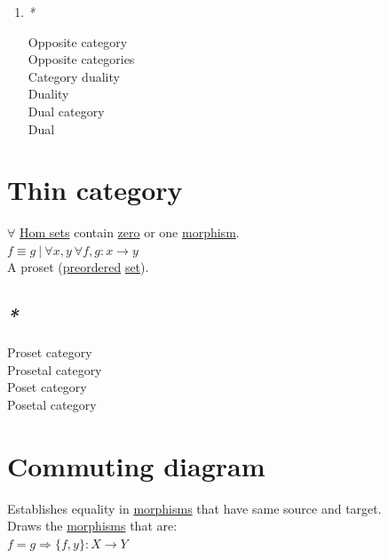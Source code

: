 \documentclass[a4paper,14pt,oneside]{book}
\begin{document}
\begin{enumerate}
\item \emph{*}
\label{sec:orgf5b4600}

\label{org0641959}Opposite category\\
\label{orgd92905e}Opposite categories\\
\label{org3ab4e72}Category duality\\
\label{orgf3e1944}Duality\\
\label{org8c78669}Dual category\\
\label{orgccd1357}Dual\\
\end{enumerate}

\section{\label{orga42e8b7}Thin category}
\label{sec:orgf70202a}
\(\forall\) \hyperref[orgff689e2]{Hom sets} contain \hyperref[org5935190]{zero} or one \hyperref[org2170e98]{morphism}.\\

\(f \equiv g \ | \ \forall x,y \ \forall f,g: x \to y\)\\

A proset (\hyperref[orgd804c52]{preordered} \hyperref[orge119629]{set}).\\

\subsection{\emph{*}}
\label{sec:org8c5f0e4}

\label{org5d87b1c}Proset category\\
\label{org27436a4}Prosetal category\\
\label{org8366f2f}Poset category\\
\label{orgf759756}Posetal category\\

\section{\label{orgfc957c4}Commuting diagram}
\label{sec:org0179f35}
Establishes equality in \hyperref[org9d6b2ec]{morphisms} that have same source and target.\\

Draws the \hyperref[org9d6b2ec]{morphisms} that are:\\
\(f = g \Rightarrow \{f, y\}: X \to Y\)\\
\end{document}
